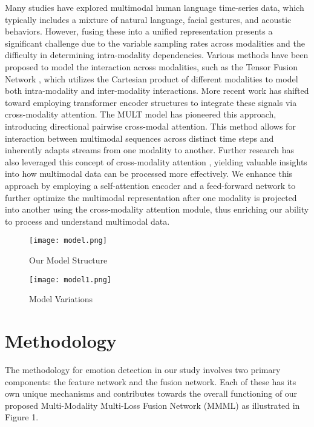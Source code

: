 \documentclass[11pt]{article}
\begin{document}
Many studies have explored multimodal human language time-series data, which typically includes a mixture of natural language, facial gestures, and acoustic behaviors. However, fusing these into a unified representation presents a significant challenge due to the variable sampling rates across modalities and the difficulty in determining intra-modality dependencies. Various methods have been proposed to model the interaction across modalities, such as the Tensor Fusion Network \cite{zadeh2017tensor}, which utilizes the Cartesian product of different modalities to model both intra-modality and inter-modality interactions. More recent work has shifted toward employing transformer encoder structures to integrate these signals via cross-modality attention. The MULT model \cite{tsai2019multimodal} has pioneered this approach, introducing directional pairwise cross-modal attention. This method allows for interaction between multimodal sequences across distinct time steps and inherently adapts streams from one modality to another.  
Further research has also leveraged this concept of cross-modality attention \cite{9928357} \cite{paraskevopoulos2022mmlatch}, yielding valuable insights into how multimodal data can be processed more effectively. We enhance this approach by employing a self-attention encoder and a feed-forward network to further optimize the multimodal representation after one modality is projected into another using the cross-modality attention module, thus enriching our ability to process and understand multimodal data.

\begin{figure*}[ht]
  \centering
  \begin{minipage}{0.5\textwidth}
    \centering
    \texttt{[image: model.png]}
    \caption{Our Model Structure}
    \label{fig:label1}
  \end{minipage}\hfill
  \begin{minipage}{0.5\textwidth}
    \centering
    \texttt{[image: model1.png]}
    \caption{Model Variations}
    \label{fig:label2}
  \end{minipage}
\end{figure*}

\section{Methodology}
The methodology for emotion detection in our study involves two primary components: the feature network and the fusion network. Each of these has its own unique mechanisms and contributes towards the overall functioning of our proposed Multi-Modality Multi-Loss Fusion Network (MMML) as illustrated in Figure 1. 
\end{document}
